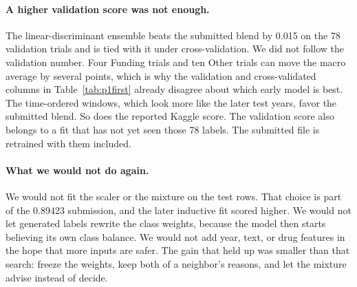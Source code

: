 \paragraph{A higher validation score was not enough.}
The linear-discriminant ensemble beats the submitted blend by 0.015 on the 78
validation trials and is tied with it under cross-validation. We did not follow
the validation number. Four Funding trials and ten Other trials can move the
macro average by several points, which is why the validation and
cross-validated columns in Table~\ref{tab:p1first} already disagree about which
early model is best. The time-ordered windows, which look more like the later
test years, favor the submitted blend. So does the reported Kaggle score. The
validation score also belongs to a fit that has not yet seen those 78 labels.
The submitted file is retrained with them included.

\paragraph{What we would not do again.}
We would not fit the scaler or the mixture on the test rows. That choice is part
of the 0.89423 submission, and the later inductive fit scored higher. We would
not let generated labels rewrite the class weights, because the model then starts
believing its own class balance. We would not add year, text, or drug features
in the hope that more inputs are safer. The gain that held up was smaller than
that search: freeze the weights, keep both of a neighbor's reasons, and let the
mixture advise instead of decide.
